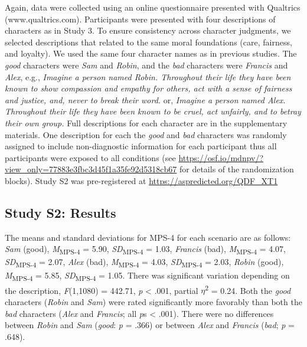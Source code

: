 \documentclass[
  man,floatsintext]{apa6}
\begin{document}
Again, data were collected using an online questionnaire presented with Qualtrics (www.qualtrics.com). Participants were presented with four descriptions of characters as in Study 3. To ensure consistency across character judgments, we selected descriptions that related to the same moral foundations (care, fairness, and loyalty). We used the same four character names as in previous studies. The \emph{good} characters were \emph{Sam} and \emph{Robin}, and the \emph{bad} characters were \emph{Francis} and \emph{Alex}, e.g., \emph{Imagine a person named Robin. Throughout their life they have been known to show compassion and empathy for others, act with a sense of fairness and justice, and, never to break their word.} or, \emph{Imagine a person named Alex. Throughout their life they have been known to be cruel, act unfairly, and to betray their own group.} Full descriptions for each character are in the supplementary materials. One description for each the \emph{good} and \emph{bad} characters was randomly assigned to include non-diagnostic information for each participant thus all participants were exposed to all conditions (see \color{blue}\url{https://osf.io/mdnpv/?view_only=77883e3fbc3d45f1a35fe92d5318cb67}\color{black} for details of the randomization blocks). Study S2 was pre-registered at \color{blue}\url{https://aspredicted.org/QDF_XT1}\color{black}

\subsection{Study S2: Results}\label{study-s2-results}

The means and standard deviations for MPS-4 for each scenario are as follows:
\emph{Sam} (good),
\emph{M}\textsubscript{MPS-4} = 5.90, \emph{SD}\textsubscript{MPS-4} = 1.03,
\emph{Francis} (bad),
\emph{M}\textsubscript{MPS-4} = 4.07, \emph{SD}\textsubscript{MPS-4} = 2.07,
\emph{Alex} (bad),
\emph{M}\textsubscript{MPS-4} = 4.03, \emph{SD}\textsubscript{MPS-4} = 2.03,
\emph{Robin} (good),
\emph{M}\textsubscript{MPS-4} = 5.85, \emph{SD}\textsubscript{MPS-4} = 1.05. There was significant variation depending on the description, \emph{F}(1,1080) = 442.71, \emph{p} \textless{} .001, partial \(\eta\)\textsuperscript{2} = 0.24. Both the \emph{good} characters (\emph{Robin} and \emph{Sam}) were rated significantly more favorably than both the \emph{bad} characters (\emph{Alex} and \emph{Francis}; all \emph{p}s \textless{} .001). There were no differences between \emph{Robin} and \emph{Sam} (\emph{good}: \emph{p} = .366) or between \emph{Alex} and \emph{Francis} (\emph{bad}; \emph{p} = .648).
\end{document}
